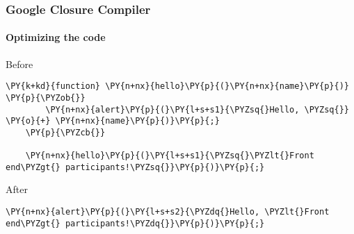 \begin{frame}[fragile]
  \frametitle{Google Closure Compiler}
  \framesubtitle{Optimizing the code}

  \begin{block}{Before}
  \begin{Verbatim}[commandchars=\\\{\}]
    \PY{k+kd}{function} \PY{n+nx}{hello}\PY{p}{(}\PY{n+nx}{name}\PY{p}{)} \PY{p}{\PYZob{}}
        \PY{n+nx}{alert}\PY{p}{(}\PY{l+s+s1}{\PYZsq{}Hello, \PYZsq{}} \PY{o}{+} \PY{n+nx}{name}\PY{p}{)}\PY{p}{;}
    \PY{p}{\PYZcb{}}

    \PY{n+nx}{hello}\PY{p}{(}\PY{l+s+s1}{\PYZsq{}\PYZlt{}Front end\PYZgt{} participants!\PYZsq{}}\PY{p}{)}\PY{p}{;}
  \end{Verbatim}
  \end{block}

  \pause

  \begin{block}{After}
    \begin{Verbatim}[commandchars=\\\{\}]
      \PY{n+nx}{alert}\PY{p}{(}\PY{l+s+s2}{\PYZdq{}Hello, \PYZlt{}Front end\PYZgt{} participants!\PYZdq{}}\PY{p}{)}\PY{p}{;}
    \end{Verbatim}

  \end{block}
\end{frame}